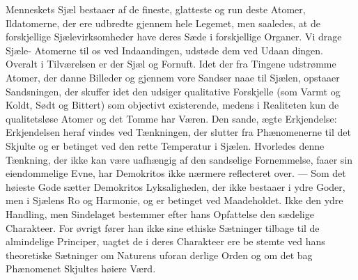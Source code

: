 \documentclass[12pt,a4paper]{book}
\begin{document}
Menneskets Sjæl bestaaer af de fineste, glatteste og run\-%
deste Atomer, Ildatomerne, der ere udbredte gjennem hele
Legemet, men saaledes, at de forskjellige Sjælevirksomheder
have deres Sæde i forskjellige Organer. Vi drage Sjæle-%
Atomerne til os ved Indaandingen, udstøde dem ved Udaan\-%
dingen. Overalt i Tilværelsen er der Sjæl og Fornuft. Idet
der fra Tingene udstrømme Atomer, der danne Billeder og
gjennem vore Sandser naae til Sjælen, opstaaer Sandsningen,
der skuffer idet den udsiger qualitative Forskjelle (som Varmt
og Koldt, Sødt og Bittert) som objectivt existerende, medens
i Realiteten kun de qualitetsløse Atomer og det Tomme
har Væren. Den sande, ægte Erkjendelse: Erkjendelsen heraf
vindes ved Tænkningen, der slutter fra Phænomenerne til det
Skjulte og er betinget ved den rette Temperatur i Sjælen.
Hvorledes denne Tænkning, der ikke kan være uafhængig af
den sandselige Fornemmelse, faaer sin eiendommelige Evne,
har Demokritos ikke nærmere reflecteret over. --- Som det høieste
Gode sætter Demokritos Lyksaligheden, der ikke bestaaer i
ydre Goder, men i Sjælens Ro og Harmonie, og er betinget
ved Maadeholdet. Ikke den ydre Handling, men Sindelaget
bestemmer efter hans Opfattelse den sædelige Charakteer. For\-%
øvrigt fører han ikke sine ethiske Sætninger tilbage til de
almindelige Principer, uagtet de i deres Charakteer ere be\-%
stemte ved hans theoretiske Sætninger om Naturens uforan\-%
derlige Orden og om det bag Phænomenet Skjultes høiere Værd.
\end{document}

